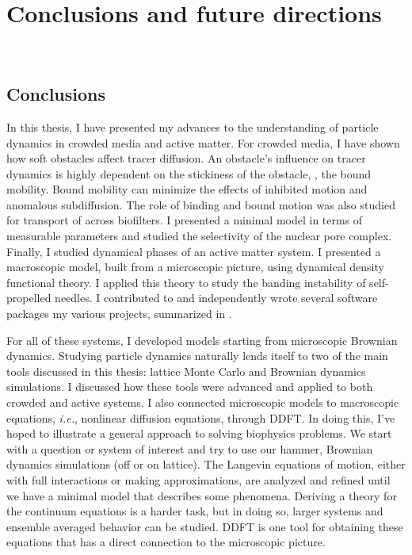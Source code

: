 \chapter{Conclusions and future directions}~\label{ch10_conclusions}
\section{Conclusions}
In this thesis, I have presented my advances to the understanding of particle
dynamics in crowded media and active matter.  For crowded media, I have shown
how soft obstacles affect tracer diffusion.  An obstacle's influence on tracer
dynamics is highly dependent on the stickiness of the obstacle, ,
the bound mobility.  Bound mobility can minimize the effects of inhibited motion
and anomalous subdiffusion.  The role of binding and bound motion was also
studied for transport of across biofilters.  I presented a minimal model in
terms of measurable parameters and studied the selectivity
of the nuclear pore complex.  Finally, I studied dynamical phases of an active
matter system.  I presented a macroscopic model, built from a microscopic
picture, using dynamical density functional theory.  I applied this theory to
study the banding instability of self-propelled needles. I contributed to and
independently wrote several software packages my various projects, summarized in
.

For all of these systems, I developed models starting from microscopic
Brownian dynamics.  Studying particle dynamics  naturally lends itself
to two of the main tools discussed in this thesis: lattice Monte Carlo and
Brownian dynamics simulations.  I discussed how these tools were advanced and
applied to both crowded and active systems.  I also connected microscopic models
to macroscopic equations, \textit{i.e.}, nonlinear diffusion equations, through
DDFT\@.  In doing this, I've hoped to illustrate a general approach to solving
biophysics problems.  We start with a question or system of interest and try to
use our hammer, Brownian dynamics simulations (off or on lattice).  The
Langevin equations of motion, either with full interactions or making
approximations, are analyzed and refined until we have a minimal model that
describes some phenomena.  Deriving a theory for the continuum equations is a
harder task, but in doing so, larger systems and ensemble averaged behavior can
be studied. DDFT is one tool for obtaining these equations that has a direct
connection to the microscopic picture.

